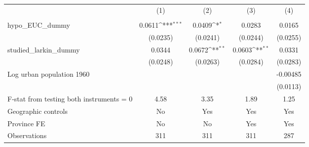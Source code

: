 {
\def\sym#1{\ifmmode^{#1}\else\(^{#1}\)\fi}
\begin{tabular}{l*{4}{c}}
\hline\hline
                &\multicolumn{1}{c}{(1)}&\multicolumn{1}{c}{(2)}&\multicolumn{1}{c}{(3)}&\multicolumn{1}{c}{(4)}\\
                &\multicolumn{1}{c}{}&\multicolumn{1}{c}{}&\multicolumn{1}{c}{}&\multicolumn{1}{c}{}\\
\hline
hypo\_EUC\_dummy  &   0.0611\sym{***}&   0.0409\sym{*}  &   0.0283         &   0.0165         \\
                & (0.0235)         & (0.0241)         & (0.0244)         & (0.0255)         \\
[1em]
studied\_larkin\_dummy&   0.0344         &   0.0672\sym{**} &   0.0603\sym{**} &   0.0331         \\
                & (0.0248)         & (0.0263)         & (0.0284)         & (0.0283)         \\
[1em]
Log urban population 1960&                  &                  &                  & -0.00485         \\
                &                  &                  &                  & (0.0113)         \\
\hline
F-stat from testing both instruments = 0&     4.58         &     3.35         &     1.89         &     1.25         \\
Geographic controls&       No         &      Yes         &      Yes         &      Yes         \\
Province FE     &       No         &       No         &      Yes         &      Yes         \\
Observations    &      311         &      311         &      311         &      287         \\
\hline\hline
\end{tabular}
}
